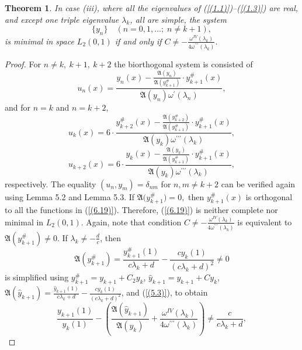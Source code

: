 \documentclass[pdflatex,sn-mathphys-num]{sn-jnl}%
\theoremstyle{thmstyleone}%
\theoremstyle{thmstyletwo}%
\theoremstyle{thmstylethree}%
\newtheorem{thm}{Theorem}[section]
\theoremstyle{definition}
\theoremstyle{remark}
\numberwithin{equation}{section}
\begin{document}
\begin{thm} 
In case (iii), where  all the eigenvalues of (\ref{(1.1)})--(\ref{(1.3)}) are real, and except one triple eigenvalue $\lambda_k$, all are simple, the system
\begin{equation}
  \{ y_n \} \quad (n = 0,1,\ldots;\; n \neq k+1), \label{(6.19)} 
\end{equation}
is minimal in space $L_2(0,1)$ if and only if $C\neq-\frac{\omega^{IV}(\lambda_k)}{4\omega^{\prime\prime\prime}(\lambda_k)}$.
\end{thm}

\begin{proof}
 For $n \ne k,\ k+1,\ k+2$ the biorthogonal system is consisted of
\begin{equation}
u_n(x)=\frac{y_n(x)-\frac{\mathfrak{A}(y_{n})}{\mathfrak{A}(y_{k+1}^{\#})}\cdot y^{\#}_{k+1}(x)}{ \mathfrak{A}(y_{n})\omega^\prime(\lambda_n)}
, \label{(6.20)}
\end{equation}
and for $n = k$ and $n = k+2$,
\begin{equation}
u_k(x)=6\cdot\frac{y^{\#}_{k+2}(x)-\frac{\mathfrak{A}(y^{\#}_{k+2})}{\mathfrak{A}(y^{\#}_{k+1})}\cdot y^{\#}_{k+1}(x)}{ \mathfrak{A}(y_k)\omega^{\prime\prime\prime}(\lambda_k)}
, \label{(6.21)}
\end{equation}
\begin{equation}
u_{k+2}(x)=6\cdot\frac{y_{k}(x)-\frac{\mathfrak{A}(y_{k})}{\mathfrak{A}(y^{\#}_{k+1})}\cdot y^{\#}_{k+1}(x)}{ \mathfrak{A}(y_{k})\omega^{\prime\prime\prime}(\lambda_k)}
, \label{(6.22)}
\end{equation}
respectively.
The equality $(u_n, y_m) = \delta_{nm}$ for $ n,m\neq k+2$ can be verified again using Lemma 5.2 and Lemma 5.3.
If
\(
\mathfrak{A}\bigl(y_{k+1}^{\#}\bigr)=0,
\)
then $y_{k+1}^{\#}(x)$ is orthogonal to 
all the functions in (\ref{(6.19)}). Therefore, (\ref{(6.19)}) is neither complete nor minimal in $L_2(0,1)$.
Again, note that condition $C\neq-\frac{\omega^{IV}(\lambda_k)}{4\omega^{\prime\prime\prime}(\lambda_k)}$ is equivalent to $\mathfrak{A}(y_{k+1}^{\#})\ne 0$. If $\lambda_k\neq-\frac{d}{c}$, then
\begin{equation}
 \mathfrak{A}(y^{\#}_{k+1}) =
\frac{y^{\#}_{k + 1}(1)}{c\lambda_{k}+d} - \frac{cy_{k}(1)}{{(c\lambda_{k}+d)}^{2}}\neq0
 \label{(6.20.1)}
\end{equation}
is simplified using $y_{k+1}^\# = y_{k+1} + C_2 y_k$, $\hat{y}_{k+1}={y}_{k+1}+Cy_k$,
$\mathfrak{A}(\hat{y}_{k+1}) =
\frac{\hat{y}_{k + 1}(1)}{c\lambda_{k}+d} - \frac{cy_{k}(1)}{{(c\lambda_{k}+d)}^{2}}$, 
and (\ref{(5.3)}), to obtain
$$
\frac{{y}_{k+1}(1)}{y_{k}(1)}-\left(\frac{\mathfrak{A}(\hat{y}_{k+1})}{\mathfrak{A}({y}_{k})}+\frac{\omega^{IV}(\lambda_k)}{4\omega^{\prime\prime\prime}(\lambda_k)}\right)\neq \frac{c}{c\lambda_{k}+d}, $$


\end{proof}
\end{document}
